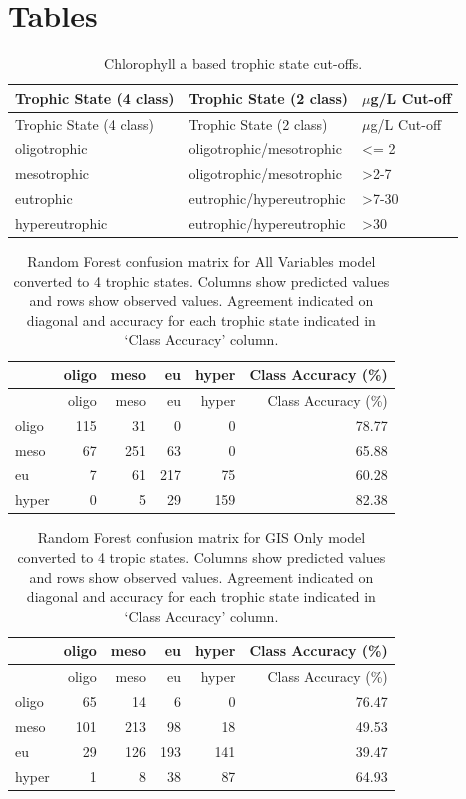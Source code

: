 \documentclass[12pt,]{article}
\begin{document}
\newpage

\section{Tables}\label{tables}

\begin{longtable}[c]{@{}lll@{}}
\caption{Chlorophyll a based trophic state cut-offs.
\label{tab:trophicStateTable}}\tabularnewline
\toprule
Trophic State (4 class) & Trophic State (2 class) & \(\mu\)g/L
Cut-off\tabularnewline
\midrule
\endfirsthead
\toprule
Trophic State (4 class) & Trophic State (2 class) & \(\mu\)g/L
Cut-off\tabularnewline
\midrule
\endhead
oligotrophic & oligotrophic/mesotrophic & \textless{}= 2\tabularnewline
mesotrophic & oligotrophic/mesotrophic &
\textgreater{}2-7\tabularnewline
eutrophic & eutrophic/hypereutrophic & \textgreater{}7-30\tabularnewline
hypereutrophic & eutrophic/hypereutrophic &
\textgreater{}30\tabularnewline
\bottomrule
\end{longtable}

\newpage

\begin{longtable}[c]{@{}lrrrrr@{}}
\caption{Random Forest confusion matrix for All Variables model
converted to 4 trophic states. Columns show predicted values and rows
show observed values. Agreement indicated on diagonal and accuracy for
each trophic state indicated in `Class Accuracy' column.
\label{tab:Confusion_All_4}}\tabularnewline
\toprule
& oligo & meso & eu & hyper & Class Accuracy (\%)\tabularnewline
\midrule
\endfirsthead
\toprule
& oligo & meso & eu & hyper & Class Accuracy (\%)\tabularnewline
\midrule
\endhead
oligo & 115 & 31 & 0 & 0 & 78.77\tabularnewline
meso & 67 & 251 & 63 & 0 & 65.88\tabularnewline
eu & 7 & 61 & 217 & 75 & 60.28\tabularnewline
hyper & 0 & 5 & 29 & 159 & 82.38\tabularnewline
\bottomrule
\end{longtable}

\newpage

\begin{longtable}[c]{@{}lrrrrr@{}}
\caption{Random Forest confusion matrix for GIS Only model converted to
4 tropic states. Columns show predicted values and rows show observed
values. Agreement indicated on diagonal and accuracy for each trophic
state indicated in `Class Accuracy' column.
\label{tab:Confusion_GIS_4}}\tabularnewline
\toprule
& oligo & meso & eu & hyper & Class Accuracy (\%)\tabularnewline
\midrule
\endfirsthead
\toprule
& oligo & meso & eu & hyper & Class Accuracy (\%)\tabularnewline
\midrule
\endhead
oligo & 65 & 14 & 6 & 0 & 76.47\tabularnewline
meso & 101 & 213 & 98 & 18 & 49.53\tabularnewline
eu & 29 & 126 & 193 & 141 & 39.47\tabularnewline
hyper & 1 & 8 & 38 & 87 & 64.93\tabularnewline
\bottomrule
\end{longtable}
\end{document}
